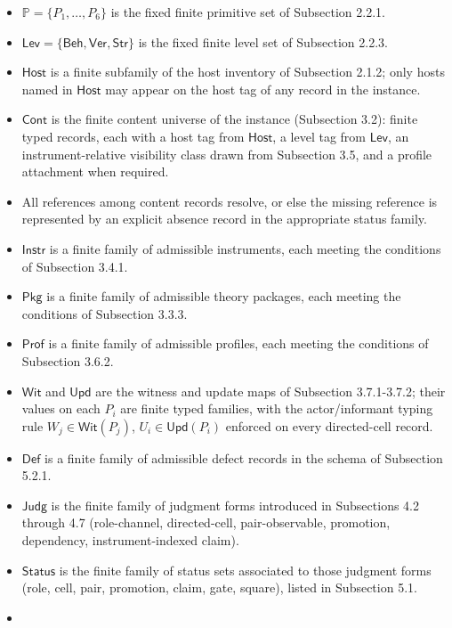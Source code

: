 \documentclass[11pt]{article}
\providecommand{\tightlist}{}
\theoremstyle{definition}
\begin{document}
\begin{itemize}
\tightlist
\item
  \(\mathbb P=\{P_1,\ldots,P_6\}\) is the fixed finite primitive set of Subsection 2.2.1.
\item
  \(\mathsf{Lev}=\{\mathsf{Beh},\mathsf{Ver},\mathsf{Str}\}\) is the fixed finite level set of Subsection 2.2.3.
\item
  \(\mathsf{Host}\) is a finite subfamily of the host inventory of Subsection 2.1.2; only hosts named in \(\mathsf{Host}\) may appear on the host tag of any record in the instance.
\item
  \(\mathsf{Cont}\) is the finite content universe of the instance (Subsection 3.2): finite typed records, each with a host tag from \(\mathsf{Host}\), a level tag from \(\mathsf{Lev}\), an instrument-relative visibility class drawn from Subsection 3.5, and a profile attachment when required.
\item
  All references among content records resolve, or else the missing reference is represented by an explicit absence record in the appropriate status family.
\item
  \(\mathsf{Instr}\) is a finite family of admissible instruments, each meeting the conditions of Subsection 3.4.1.
\item
  \(\mathsf{Pkg}\) is a finite family of admissible theory packages, each meeting the conditions of Subsection 3.3.3.
\item
  \(\mathsf{Prof}\) is a finite family of admissible profiles, each meeting the conditions of Subsection 3.6.2.
\item
  \(\mathsf{Wit}\) and \(\mathsf{Upd}\) are the witness and update maps of Subsection 3.7.1-3.7.2; their values on each \(P_i\) are finite typed families, with the actor/informant typing rule \(W_j\in\mathsf{Wit}(P_j)\), \(U_i\in\mathsf{Upd}(P_i)\) enforced on every directed-cell record.
\item
  \(\mathsf{Def}\) is a finite family of admissible defect records in the schema of Subsection 5.2.1.
\item
  \(\mathsf{Judg}\) is the finite family of judgment forms introduced in Subsections 4.2 through 4.7 (role-channel, directed-cell, pair-observable, promotion, dependency, instrument-indexed claim).
\item
  \(\mathsf{Status}\) is the finite family of status sets associated to those judgment forms (role, cell, pair, promotion, claim, gate, square), listed in Subsection 5.1.
\item

\end{itemize}
\end{document}
